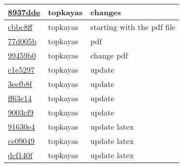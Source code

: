 \begin{tabular}{l l l}
\href{git@github.com:topkayas/CS444/commit/8937dde711a688881683e2152fe987dca0021c3a}{8937dde} & topkayas & changes\\\hline
\href{git@github.com:topkayas/CS444/commit/cbbc8ff7c82f89baa2d096fe8a62432bf2d8002a}{cbbc8ff} & topkayas & starting with the pdf file\\\hline
\href{git@github.com:topkayas/CS444/commit/77d005ba46dff628ae08cbf01501ac260fa9bae4}{77d005b} & topkayas & pdf\\\hline
\href{git@github.com:topkayas/CS444/commit/99459b04d20c397edfe76334ee23804c014fa7fd}{99459b0} & topkayas & change pdf\\\hline
\href{git@github.com:topkayas/CS444/commit/c1e529725300d2017c355c06db4a17df5557cbb5}{c1e5297} & topkayas & update\\\hline
\href{git@github.com:topkayas/CS444/commit/3eefb8fe8b6feb386fb728920dc22866fe264185}{3eefb8f} & topkayas & update\\\hline
\href{git@github.com:topkayas/CS444/commit/ff63e14ca05eff15c6eabeb6004dfbeadb56d630}{ff63e14} & topkayas & update\\\hline
\href{git@github.com:topkayas/CS444/commit/9003cf91fc096990444cbdebb32a0b81b6eccc68}{9003cf9} & topkayas & update\\\hline
\href{git@github.com:topkayas/CS444/commit/91630e465af29a2114228f046547399cb34dc840}{91630e4} & topkayas & update latex\\\hline
\href{git@github.com:topkayas/CS444/commit/ce0904949a518e35ceb040fc1c678832a315bc9c}{ce09049} & topkayas & update latex\\\hline
\href{git@github.com:topkayas/CS444/commit/dcf140f4c18d0aaf99c6cb44ccfbd28eb8c82e65}{dcf140f} & topkayas & update latex\\\hline\end{tabular}
